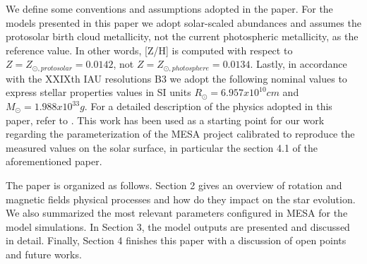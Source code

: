 \documentclass[fleqn,usenatbib]{mnras}
\begin{document}
We define some conventions and assumptions adopted in the paper. For the models presented in this paper we adopt solar-scaled abundances and assumes the \citet{Asplund2009} protosolar birth cloud metallicity, not the current photospheric metallicity, as the reference value. In other words, [Z/H] is computed with respect to $Z = Z_{\odot, protosolar} = 0.0142$, not $Z = Z_{\odot, photosphere} = 0.0134$. Lastly, in accordance with the XXIXth IAU resolutions B3 \citep{Mamajek2015} we adopt the following nominal values to express stellar properties values in SI units $R_{\odot} = 6.957x10^{10} cm$ and $M_{\odot} = 1.988x10^{33} g$. For a detailed description of the physics adopted in this paper, refer to \citet{Choi2016}. This work has been used as a starting point for our work regarding the parameterization of the MESA project calibrated to reproduce the measured values on the solar surface, in particular the section 4.1 of the aforementioned paper.\par

The paper is organized as follows. Section 2 gives an overview of rotation and magnetic fields physical processes and how do they impact on the star evolution. We also summarized the most relevant parameters configured in MESA for the model simulations. In Section 3, the model outputs are presented and discussed in detail. Finally, Section 4 finishes this paper with a discussion of open points and future works.\par
\end{document}
